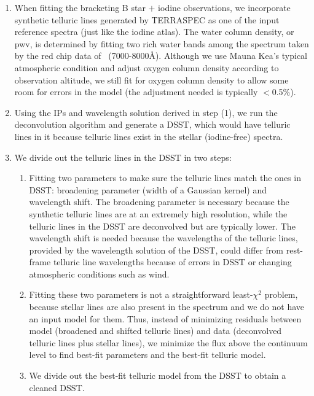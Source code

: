 \begin{enumerate}
\item When fitting the bracketing B star $+$ iodine observations, we
  incorporate synthetic telluric lines generated by TERRASPEC as one of
  the input reference spectra (just like the iodine atlas). The water
  column density, or pwv, is determined by fitting two rich water bands
  among the spectrum taken by the red chip data of \keck\
  (7000-8000\AA). Although we use Mauna Kea's typical atmospheric
  condition and adjust oxygen column density according to observation
  altitude, we still fit for oxygen column density to allow some room
  for errors in the model (the adjustment needed is typically $<$0.5\%).
\item Using the IPs and wavelength solution derived in step (1), we
  run the deconvolution algorithm and generate a DSST, which would
  have telluric lines in it because telluric lines exist in the
  stellar (iodine-free) spectra.
\item We divide out the telluric lines in the DSST in two steps: 
  \begin{enumerate}
  \item Fitting two parameters to make sure the telluric lines match
    the ones in DSST: broadening parameter (width of a Gaussian
    kernel) and wavelength shift. The broadening parameter is
    necessary because the synthetic telluric lines are at an extremely
    high resolution, while the telluric lines in the DSST are
    deconvolved but are typically lower. The wavelength shift is
    needed because the wavelengths of the telluric lines, provided by
    the wavelength solution of the DSST, could differ from rest-frame
    telluric line wavelengths because of errors in DSST or changing
    atmospheric conditions such as wind. 
  \item Fitting these two parameters is not a straightforward
    least-$\chi^2$ problem, because stellar lines are also present in the
    spectrum and we do not have an input model for them. Thus, instead
    of minimizing residuals between model (broadened and shifted
    telluric lines) and data (deconvolved telluric lines plus stellar
    lines), we minimize the flux above the continuum level to find
    best-fit parameters and the best-fit telluric model.
  \item We divide out the best-fit telluric model from the DSST to
    obtain a cleaned DSST.
  \end{enumerate}
\end{enumerate}

